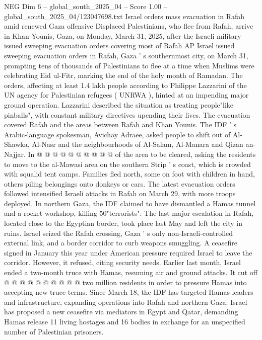 \begin{textsample}{NEG Dim 6 – global\_south\_2025\_04 – Score 1.00 – global\_south\_2025\_04/123047698.txt}  \label{ex:f6_neg_175}
Israel orders mass evacuation in Rafah amid renewed Gaza offensive Displaced Palestinians, who flee from Rafah, arrive in Khan Younis, Gaza, on Monday, March 31, 2025, after the Israeli military issued sweeping evacuation orders covering most of Rafah AP Israel issued sweeping evacuation orders in Rafah, Gaza ' s southernmost city, on March 31, prompting tens of thousands of Palestinians to flee at a time when Muslims were celebrating Eid ul-Fitr, marking the end of the holy month of Ramadan.
The orders, affecting at least 1.4 lakh people according to Philippe Lazzarini of the UN agency for Palestinian refugees ( UNRWA ), hinted at an impending major ground operation.
Lazzarini described the situation as treating people"like pinballs", with constant military directives upending their lives.
The evacuation covered Rafah and the areas between Rafah and Khan Younis.
The IDF ' s Arabic-language spokesman, Avichay Adraee, asked people to shift out of Al-Shawka, Al-Nasr and the neighbourhoods of Al-Salam, Al-Manara and Qizan an-Najjar.
In @ @ @ @ @ @ @ @ @ @ of the area to be cleared, asking the residents to move to the al-Mawasi area on the southern Strip ' s coast, which is crowded with squalid tent camps.
Families fled north, some on foot with children in hand, others piling belongings onto donkeys or cars.
The latest evacuation orders followed intensified Israeli attacks in Rafah on March 29, with more troops deployed.
In northern Gaza, the IDF claimed to have dismantled a Hamas tunnel and a rocket workshop, killing 50"terrorists".
The last major escalation in Rafah, located close to the Egyptian border, took place last May and left the city in ruins.
Israel seized the Rafah crossing, Gaza ' s only non-Israeli-controlled external link, and a border corridor to curb weapons smuggling.
A ceasefire signed in January this year under American pressure required Israel to leave the corridor.
However, it refused, citing security needs.
Earlier last month, Israel ended a two-month truce with Hamas, resuming air and ground attacks.
It cut off @ @ @ @ @ @ @ @ @ @ two million residents in order to pressure Hamas into accepting new truce terms.
Since March 18, the IDF has targeted Hamas leaders and infrastructure, expanding operations into Rafah and northern Gaza.
Israel has proposed a new ceasefire via mediators in Egypt and Qatar, demanding Hamas release 11 living hostages and 16 bodies in exchange for an unspecified number of Palestinian prisoners.

\end{textsample}
